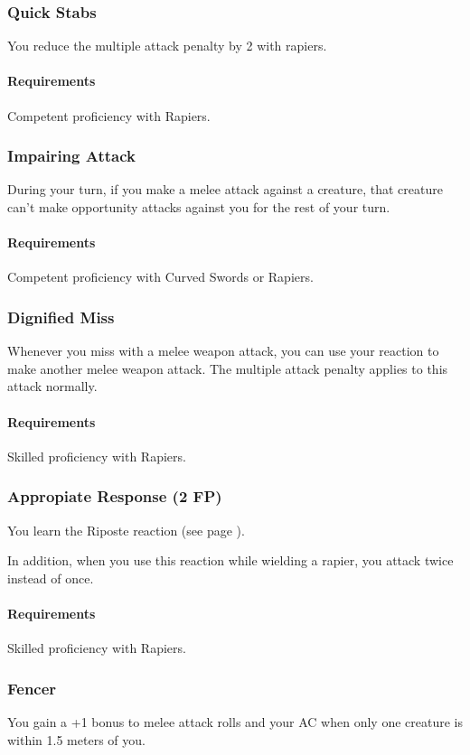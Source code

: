 \subsubsection{Quick Stabs} \label{feat::quickstabs}
    You reduce the multiple attack penalty by 2 with rapiers.
    \paragraph{Requirements} Competent proficiency with Rapiers.
\subsubsection{Impairing Attack} \label{feat::impairingattack}
    During your turn, if you make a melee attack against a creature, that creature can't make opportunity attacks against you for the rest of your turn.
    \paragraph{Requirements} Competent proficiency with Curved Swords or Rapiers.
\subsubsection{Dignified Miss} \label{feat::dignifiedmiss}
    Whenever you miss with a melee weapon attack, you can use your reaction to make another melee weapon attack.
    The multiple attack penalty applies to this attack normally.
    \paragraph{Requirements} Skilled proficiency with Rapiers.
\subsubsection{Appropiate Response (2 FP)} \label{feat::appropiateresponse}
    You learn the Riposte reaction (see page \pageref{act::riposte}).

    In addition, when you use this reaction while wielding a rapier, you attack twice instead of once.
    \paragraph{Requirements} Skilled proficiency with Rapiers.
\subsubsection{Fencer} \label{feat::fencer}
    You gain a +1 bonus to melee attack rolls and your AC when only one creature is within 1.5 meters of you.
